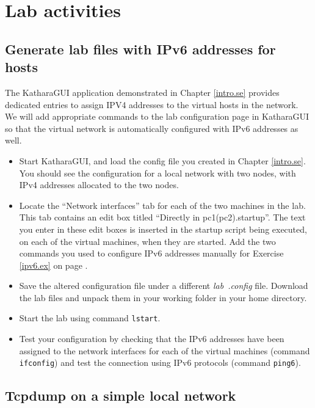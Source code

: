 \documentclass[12pt]{book}
\begin{document}
\section{Lab activities}

\subsection{Generate lab files with IPv6 addresses for
  hosts}\label{2nodes-ipv6.se} 

The KatharaGUI application demonstrated in Chapter \ref{intro.se}
provides dedicated entries to assign IPV4 addresses to the virtual
hosts in the network. We will add appropriate commands to the lab
configuration page in KatharaGUI so that the virtual network is
automatically configured with IPv6 addresses as well.

\begin{itemize}[label=--]
\item Start KatharaGUI, and load the config file you created in
  Chapter \ref{intro.se}. You should see the configuration for a local
  network with two nodes, with IPv4 addresses allocated to the two
  nodes.
  \item Locate the ``Network interfaces'' tab for each of the two
    machines in the lab. This tab contains an edit box titled
    ``Directly in pc1(pc2).startup''. The text you enter in these edit
    boxes is inserted in the startup script being executed, on each
    of the virtual machines, when they are started. Add the two
    commands you used to configure IPv6 addresses manually for
    Exercise \ref{ipv6.ex} on page \pageref*{ipv6.ex}.
  \item Save the altered configuration file under a different
    \emph{lab~.config} file. Download the lab files and unpack them in
    your working folder in your home directory.
  \item Start the lab using command \verb$lstart$.
  \item Test your configuration by checking that the IPv6 addresses
    have been assigned to the network interfaces for each of the
    virtual machines (command \verb$ifconfig$) and test the connection
    using IPv6 protocols (command \verb$ping6$).
\end{itemize}

\subsection{Tcpdump on a simple local network}
\end{document}
